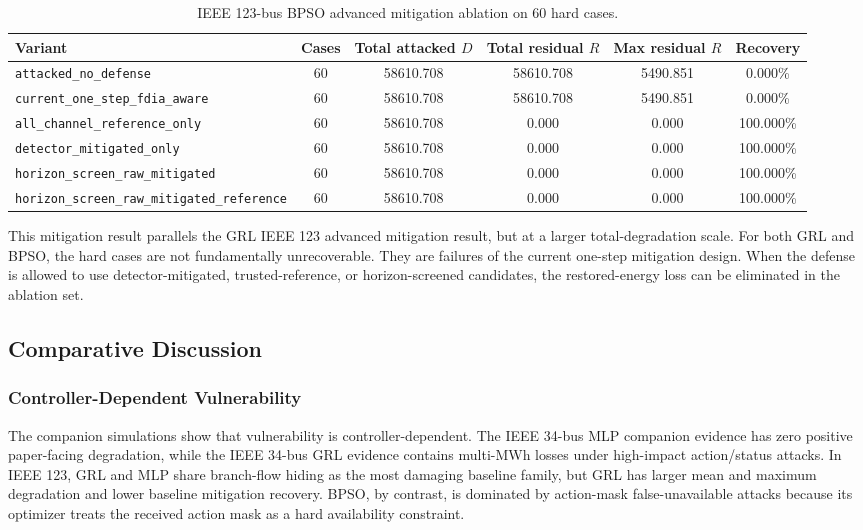 \begin{table}[t]
\centering
\caption{IEEE 123-bus BPSO advanced mitigation ablation on 60 hard cases.}
\label{tab:ieee123_bpso_advanced_mitigation}
\scriptsize
\begin{tabular}{lccccc}
\hline
Variant & Cases & Total attacked $D$ & Total residual $R$ & Max residual $R$ & Recovery \\
\hline
\texttt{attacked\_no\_defense} & 60 & 58610.708 & 58610.708 & 5490.851 & 0.000\% \\
\texttt{current\_one\_step\_fdia\_aware} & 60 & 58610.708 & 58610.708 & 5490.851 & 0.000\% \\
\texttt{all\_channel\_reference\_only} & 60 & 58610.708 & 0.000 & 0.000 & 100.000\% \\
\texttt{detector\_mitigated\_only} & 60 & 58610.708 & 0.000 & 0.000 & 100.000\% \\
\texttt{horizon\_screen\_raw\_mitigated} & 60 & 58610.708 & 0.000 & 0.000 & 100.000\% \\
\texttt{horizon\_screen\_raw\_mitigated\_reference} & 60 & 58610.708 & 0.000 & 0.000 & 100.000\% \\
\hline
\end{tabular}
\end{table}

This mitigation result parallels the GRL IEEE 123 advanced mitigation result, but at a larger total-degradation scale. For both GRL and BPSO, the hard cases are not fundamentally unrecoverable. They are failures of the current one-step mitigation design. When the defense is allowed to use detector-mitigated, trusted-reference, or horizon-screened candidates, the restored-energy loss can be eliminated in the ablation set.

\subsection{Comparative Discussion}
\label{subsec:companion_comparative_discussion}

\subsubsection{Controller-Dependent Vulnerability}
\label{subsubsec:controller_dependent_vulnerability}

The companion simulations show that vulnerability is controller-dependent. The IEEE 34-bus MLP companion evidence has zero positive paper-facing degradation, while the IEEE 34-bus GRL evidence contains multi-MWh losses under high-impact action/status attacks. In IEEE 123, GRL and MLP share branch-flow hiding as the most damaging baseline family, but GRL has larger mean and maximum degradation and lower baseline mitigation recovery. BPSO, by contrast, is dominated by action-mask false-unavailable attacks because its optimizer treats the received action mask as a hard availability constraint.


